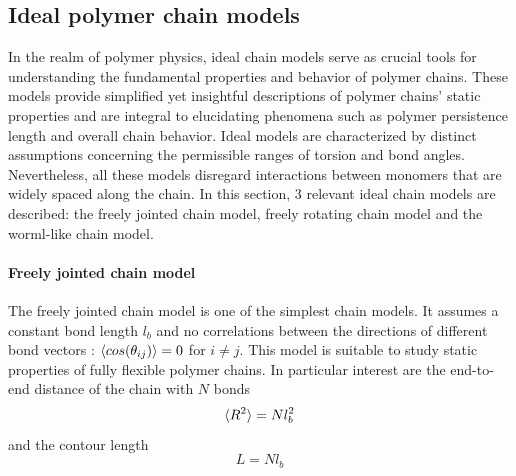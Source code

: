 \documentclass[
    paper=A4,pagesize=automedia,fontsize=12pt,
    BCOR=15mm,DIV=22,
    twoside,headinclude,footinclude=false,
    fleqn,             %
    bibliography=totocnumbered,          %
    listof=totoc,                %
    listof=flat,                 %
    cleardoublepage=empty      %
    numbers=endperiod
]{scrartcl}
\begin{document}
\subsection{Ideal polymer chain models}

In the realm of polymer physics, ideal chain models serve as crucial tools
for understanding the fundamental properties and behavior of polymer chains. 
These models provide simplified yet insightful descriptions of polymer chains' 
static properties and are integral to elucidating phenomena such as
polymer persistence length and overall chain behavior.
Ideal models are characterized by distinct assumptions concerning the 
permissible ranges of torsion and bond angles. Nevertheless, all 
these models disregard interactions between monomers that are widely 
spaced along the chain.
In this section, 3 relevant ideal chain models are described: 
the freely jointed chain model, freely rotating chain model and the worml-like chain model.

\paragraph{Freely jointed chain model}
The freely jointed chain model is one of the simplest chain models. It assumes
a constant bond length $l_b$ \cite{Rub_Colby_PolyPhy:2005} and no correlations between the directions of different
bond vectors \cite{Rub_Colby_PolyPhy:2005}: $\langle cos(\theta_{ij})\rangle = 0$ for $i \neq j$. This model is suitable
to study static properties of fully flexible polymer chains. In particular interest
are the end-to-end distance of the chain with $N$ bonds
\begin{equation}
    \langle R^2\rangle = N l_b^2
\end{equation}
and the contour length 
\begin{equation}
    L = N l_b
\end{equation}
\end{document}
